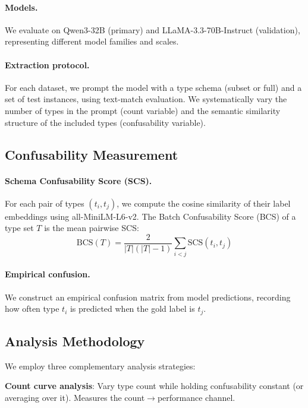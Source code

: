 \documentclass[11pt,a4paper]{article}
\begin{document}
\paragraph{Models.}
We evaluate on Qwen3-32B (primary) and LLaMA-3.3-70B-Instruct (validation), representing different model families and scales.

\paragraph{Extraction protocol.}
For each dataset, we prompt the model with a type schema (subset or full) and a set of test instances, using text-match evaluation.
We systematically vary the number of types in the prompt (count variable) and the semantic similarity structure of the included types (confusability variable).

\subsection{Confusability Measurement}

\paragraph{Schema Confusability Score (SCS).}
For each pair of types $(t_i, t_j)$, we compute the cosine similarity of their label embeddings using all-MiniLM-L6-v2.
The Batch Confusability Score (BCS) of a type set $T$ is the mean pairwise SCS:
\begin{equation}
\text{BCS}(T) = \frac{2}{|T|(|T|-1)} \sum_{i<j} \text{SCS}(t_i, t_j)
\end{equation}

\paragraph{Empirical confusion.}
We construct an empirical confusion matrix from model predictions, recording how often type $t_i$ is predicted when the gold label is $t_j$.

\subsection{Analysis Methodology}

We employ three complementary analysis strategies:

\textbf{Count curve analysis}: Vary type count while holding confusability constant (or averaging over it). Measures the count$\to$performance channel.
\end{document}
